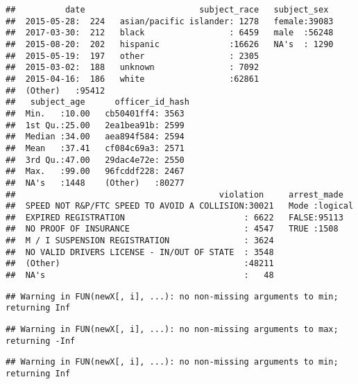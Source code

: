 \documentclass[
]{article}
\newenvironment{Shaded}{\begin{snugshade}}{\end{snugshade}}
\newcommand{\AttributeTok}[1]{\textcolor[rgb]{0.77,0.63,0.00}{#1}}
\newcommand{\CommentTok}[1]{\textcolor[rgb]{0.56,0.35,0.01}{\textit{#1}}}
\newcommand{\FunctionTok}[1]{\textcolor[rgb]{0.00,0.00,0.00}{#1}}
\newcommand{\NormalTok}[1]{#1}
\newcommand{\OtherTok}[1]{\textcolor[rgb]{0.56,0.35,0.01}{#1}}
\newcommand{\SpecialCharTok}[1]{\textcolor[rgb]{0.00,0.00,0.00}{#1}}
\begin{document}
\begin{verbatim}
##          date                       subject_race   subject_sex   
##  2015-05-28:  224   asian/pacific islander: 1278   female:39083  
##  2017-03-30:  212   black                 : 6459   male  :56248  
##  2015-08-20:  202   hispanic              :16626   NA's  : 1290  
##  2015-05-19:  197   other                 : 2305                 
##  2015-03-02:  188   unknown               : 7092                 
##  2015-04-16:  186   white                 :62861                 
##  (Other)   :95412                                                
##   subject_age      officer_id_hash 
##  Min.   :10.00   cb50401ff4: 3563  
##  1st Qu.:25.00   2ea1bea91b: 2599  
##  Median :34.00   aea894f584: 2594  
##  Mean   :37.41   cf084c69a3: 2571  
##  3rd Qu.:47.00   29dac4e72e: 2550  
##  Max.   :99.00   96fcddf228: 2467  
##  NA's   :1448    (Other)   :80277  
##                                         violation     arrest_made    
##  SPEED NOT R&P/FTC SPEED TO AVOID A COLLISION:30021   Mode :logical  
##  EXPIRED REGISTRATION                        : 6622   FALSE:95113    
##  NO PROOF OF INSURANCE                       : 4547   TRUE :1508     
##  M / I SUSPENSION REGISTRATION               : 3624                  
##  NO VALID DRIVERS LICENSE - IN/OUT OF STATE  : 3548                  
##  (Other)                                     :48211                  
##  NA's                                        :   48
\end{verbatim}

\begin{Shaded}
\end{Shaded}

\begin{verbatim}
## Warning in FUN(newX[, i], ...): no non-missing arguments to min; returning Inf
\end{verbatim}

\begin{verbatim}
## Warning in FUN(newX[, i], ...): no non-missing arguments to max; returning -Inf
\end{verbatim}

\begin{verbatim}
## Warning in FUN(newX[, i], ...): no non-missing arguments to min; returning Inf
\end{verbatim}
\end{document}
